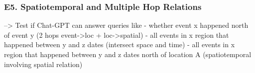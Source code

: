 \subsubsection{E5. Spatiotemporal and Multiple Hop Relations}
--> Test if Chat-GPT can answer queries like
- whether event x happened north of event y (2 hops event->loc + loc->spatial)
- all events in x region that happened between y and z dates (intersect space and time)
- all events in x region that happened between y and z dates north of location A (spatiotemporal involving spatial relation) 








        





